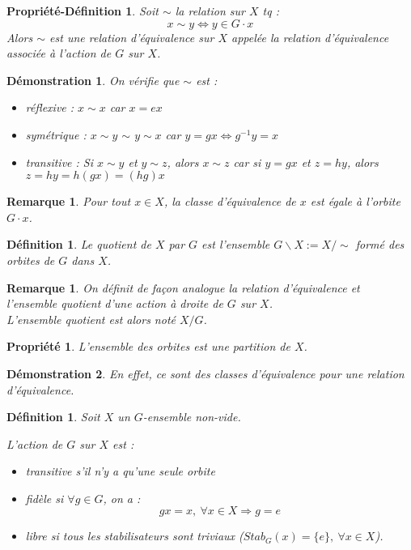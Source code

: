 \documentclass[a4paper, oneside]{report}
\theoremstyle{break}
\newtheorem{defi}[thm]{Définition}
\newtheorem{propr}[thm]{Propriété}
\newtheorem{propr-defi}[thm]{Propriété-Définition}
\newtheorem{remar}[thm]{Remarque}
\newtheorem*{demo}{Démonstration}
\begin{document}
\begin{propr-defi}
	Soit $\sim$ la relation sur $X$ tq :
	$$x\sim y \Leftrightarrow y\in G \cdot x$$
	Alors $\sim$ est une relation d'équivalence sur $X$ appelée la relation d'équivalence associée à l'action de $G$ sur $X$.
\end{propr-defi}

\begin{demo}
	On vérifie que $\sim$ est :
	\begin{itemize}
		\item réflexive : $x\sim x$ car $x=ex$
		\item symétrique : $x\sim y$ $\sim$ $y\sim x$ car $y=gx\Leftrightarrow g^{-1}y=x$
		\item transitive : Si $x\sim y$ et $y\sim z$, alors $x\sim z$ car si $y=gx$ et $z=hy$, alors $z=hy=h(gx)=(hg)x$
	\end{itemize}
\end{demo}

\begin{remar}
	Pour tout $x\in X$, la classe d'équivalence de $x$ est égale à l'orbite $G \cdot x$.	
\end{remar}

\begin{defi}
	Le quotient de $X$ par $G$ est l'ensemble $G\backslash X := X/\sim$ formé des orbites de $G$ dans $X$.
\end{defi}

\begin{remar}
	On définit de façon analogue la relation d'équivalence et l'ensemble quotient d'une action à droite de $G$ sur $X$.\\
	L'ensemble quotient est alors noté $X/G$.
\end{remar}

\begin{propr}
	L'ensemble des orbites est une partition de $X$.
\end{propr}

\begin{demo}
	En effet, ce sont des classes d'équivalence pour une relation d'équivalence.
\end{demo}

\begin{defi}
	Soit $X$ un $G$-ensemble non-vide.
	
	L'action de $G$ sur $X$ est :
	\begin{itemize}
		\item transitive s'il n'y a qu'une seule orbite
		\item fidèle si $\forall g\in G$, on a :
		$$gx=x,~\forall x\in X \Rightarrow g=e$$
		\item libre si tous les stabilisateurs sont triviaux ($Stab_G(x)=\{e\},~\forall x\in X$).
	\end{itemize}
\end{defi}
\end{document}
